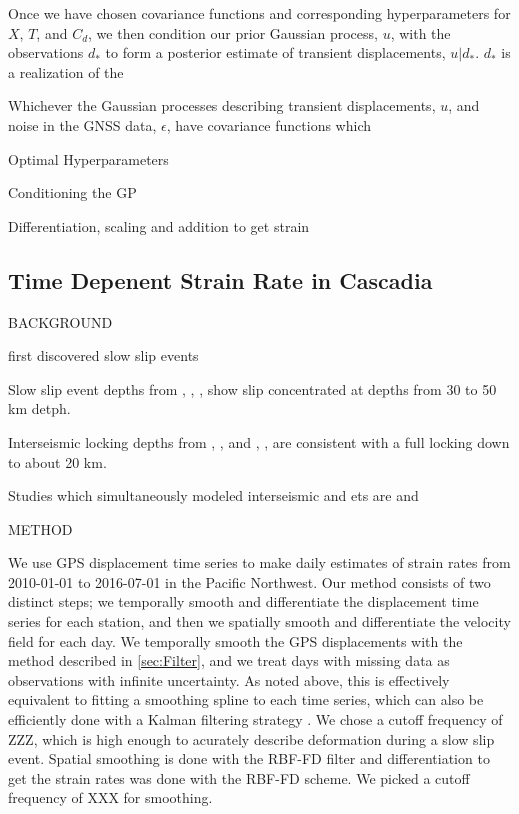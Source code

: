 \documentclass[10pt,a4paper]{article}
\begin{document}
        
Once we have chosen covariance functions and corresponding hyperparameters for $X$, $T$, and $C_d$, we then condition our prior Gaussian process, $u$, with the observations $d_*$ to form a posterior estimate of transient displacements, $u|d_*$. $d_*$ is a realization of the 
   
Whichever the Gaussian processes describing transient displacements, $u$, and noise in the GNSS data, $\epsilon$, have covariance functions which         
     
     
     
Optimal Hyperparameters

Conditioning the GP

Differentiation, scaling and addition to get strain     

\subsection{Time Depenent Strain Rate in Cascadia}\label{sec:ApplicationsCascadia}

BACKGROUND

\citet{Dragert2001} first discovered slow slip events

Slow slip event depths from \citet{Dragert2001}, \citet{Wech2009}, \citet{Schmidt2010}, \citet{Bartlow2011} show slip concentrated at depths from 30 to 50 km detph.
 
Interseismic locking depths from \citet{Fluck1997}, \citet{Murray2000}, \citet{McCaffrey2007} and \citet{McCaffrey2013}, \citet{Burgette2009}, \citet{schmalzle2014} are consistent with a full locking down to about 20 km.

Studies which simultaneously modeled interseismic and ets are \citet{Holtkamp2010} and \citet{schmalzle2014}

METHOD

We use GPS displacement time series to make daily estimates of strain rates from 2010-01-01 to 2016-07-01 in the Pacific Northwest.  Our method consists of two distinct steps; we temporally smooth and differentiate the displacement time series for each station, and then we spatially smooth and differentiate the velocity field for each day.  We temporally smooth the GPS displacements with the method described in \ref{sec:Filter}, and we treat days with missing data as observations with infinite uncertainty. As noted above, this is effectively equivalent to fitting a smoothing spline to each time series, which can also be efficiently done with a Kalman filtering strategy \citep{Kohn1987}.  We chose a cutoff frequency of ZZZ, which is high enough to acurately describe deformation during a slow slip event.  Spatial smoothing is done with the RBF-FD filter and differentiation to get the strain rates was done with the RBF-FD scheme.  We picked a cutoff frequency of XXX for smoothing.
\end{document}
